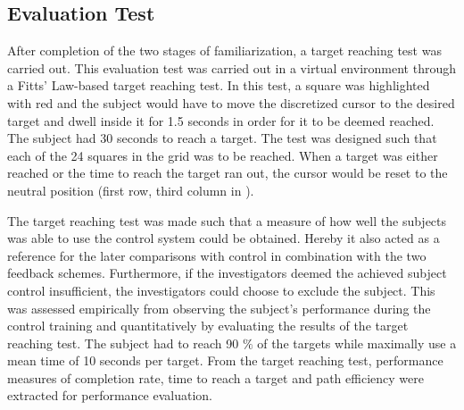 \subsection{Evaluation Test} \label{sec:meth:contest}

After completion of the two stages of familiarization, a target reaching test was carried out. This evaluation test was carried out in a virtual environment through a Fitts' Law-based target reaching test. In this test, a square was highlighted with red and the subject would have to move the discretized cursor to the desired target and dwell inside it for 1.5 seconds in order for it to be deemed reached. The subject had 30 seconds to reach a target. The test was designed such that each of the 24 squares in the grid was to be reached. When a target was either reached or the time to reach the target ran out, the cursor would be reset to the neutral position (first row, third column in ). 

The target reaching test was made such that a measure of how well the subjects was able to use the control system could be obtained. Hereby it also acted as a reference for the later comparisons with control in combination with the two feedback schemes. Furthermore, if the investigators deemed the achieved subject control insufficient, the investigators could choose to exclude the subject. This was assessed empirically from observing the subject's performance during the control training and quantitatively by evaluating the results of the target reaching test. The subject had to reach 90 $\percent$ of the targets while maximally use a mean time of 10 seconds per target. From the target reaching test, performance measures of completion rate, time to reach a target and path efficiency were extracted for performance evaluation.

